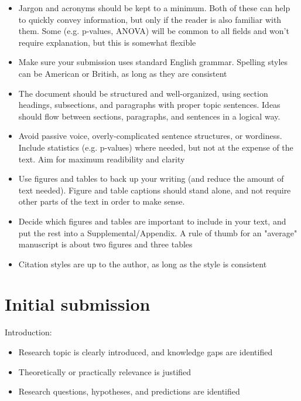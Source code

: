 \documentclass[11pt]{article}
\begin{document}
\begin{itemize}
  \item Jargon and acronyms should be kept to a minimum. Both of these can help to quickly convey information, but only if the reader is also familiar with them. Some (e.g. p-values, ANOVA) will be common to all fields and won't require explanation, but this is somewhat flexible
  \item Make sure your submission uses standard English grammar. Spelling styles can be American or British, as long as they are consistent
  \item The document should be structured and well-organized, using section headings, subsections, and paragraphs with proper topic sentences. Ideas should flow between sections, paragraphs, and sentences in a logical way.
  \item Avoid passive voice, overly-complicated sentence structures, or wordiness. Include statistics (e.g. p-values) where needed, but not at the expense of the text. Aim for maximum readibility and clarity
  \item Use figures and tables to back up your writing (and reduce the amount of text needed). Figure and table captions should stand alone, and not require other parts of the text in order to make sense.
  \item Decide which figures and tables are important to include in your text, and put the rest into a Supplemental/Appendix. A rule of thumb for an "average" manuscript is about two figures and three tables 
  \item Citation styles are up to the author, as long as the style is consistent
  
\end{itemize}


\section*{Initial submission}

Introduction:

\begin{itemize}
  \item Research topic is clearly introduced, and knowledge gaps are identified
  \item Theoretically or practically relevance is justified
  \item Research questions, hypotheses, and predictions are identified
\end{itemize}
\end{document}

